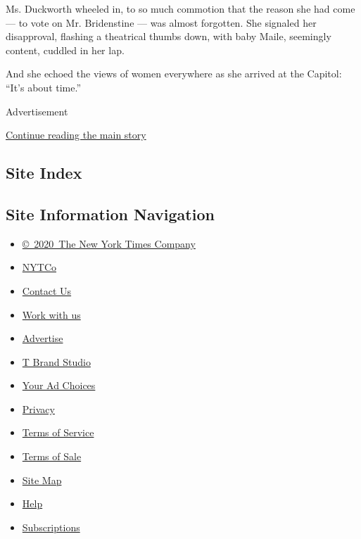 Ms. Duckworth wheeled in, to so much commotion that the reason she had
come --- to vote on Mr. Bridenstine --- was almost forgotten. She
signaled her disapproval, flashing a theatrical thumbs down, with baby
Maile, seemingly content, cuddled in her lap.

And she echoed the views of women everywhere as she arrived at the
Capitol: ``It's about time.''

Advertisement

\protect\hyperlink{after-bottom}{Continue reading the main story}

\hypertarget{site-index}{%
\subsection{Site Index}\label{site-index}}

\hypertarget{site-information-navigation}{%
\subsection{Site Information
Navigation}\label{site-information-navigation}}

\begin{itemize}
\tightlist
\item
  \href{https://help.nytimes.com/hc/en-us/articles/115014792127-Copyright-notice}{©~2020~The
  New York Times Company}
\end{itemize}

\begin{itemize}
\tightlist
\item
  \href{https://www.nytco.com/}{NYTCo}
\item
  \href{https://help.nytimes.com/hc/en-us/articles/115015385887-Contact-Us}{Contact
  Us}
\item
  \href{https://www.nytco.com/careers/}{Work with us}
\item
  \href{https://nytmediakit.com/}{Advertise}
\item
  \href{http://www.tbrandstudio.com/}{T Brand Studio}
\item
  \href{https://www.nytimes.com/privacy/cookie-policy\#how-do-i-manage-trackers}{Your
  Ad Choices}
\item
  \href{https://www.nytimes.com/privacy}{Privacy}
\item
  \href{https://help.nytimes.com/hc/en-us/articles/115014893428-Terms-of-service}{Terms
  of Service}
\item
  \href{https://help.nytimes.com/hc/en-us/articles/115014893968-Terms-of-sale}{Terms
  of Sale}
\item
  \href{https://spiderbites.nytimes.com}{Site Map}
\item
  \href{https://help.nytimes.com/hc/en-us}{Help}
\item
  \href{https://www.nytimes.com/subscription?campaignId=37WXW}{Subscriptions}
\end{itemize}
